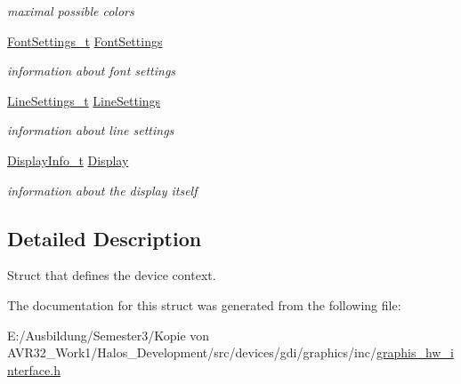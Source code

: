 \begin{CompactItemize}
\begin{CompactList}\small\item\em maximal possible colors \item\end{CompactList}\item 
\hypertarget{struct_device_context__t_3c447b3af8870b05c8dc0ba416cb0d02}{
\hyperlink{struct_font_settings__t}{FontSettings\_\-t} \hyperlink{struct_device_context__t_3c447b3af8870b05c8dc0ba416cb0d02}{FontSettings}}
\label{struct_device_context__t_3c447b3af8870b05c8dc0ba416cb0d02}

\begin{CompactList}\small\item\em information about font settings \item\end{CompactList}\item 
\hypertarget{struct_device_context__t_1b31e011cbea7dbd83f12b8f64593b5e}{
\hyperlink{struct_line_settings__t}{LineSettings\_\-t} \hyperlink{struct_device_context__t_1b31e011cbea7dbd83f12b8f64593b5e}{LineSettings}}
\label{struct_device_context__t_1b31e011cbea7dbd83f12b8f64593b5e}

\begin{CompactList}\small\item\em information about line settings \item\end{CompactList}\item 
\hypertarget{struct_device_context__t_5611d02e13f7ba77cd3048c62a5c5ae8}{
\hyperlink{struct_display_info__t}{DisplayInfo\_\-t} \hyperlink{struct_device_context__t_5611d02e13f7ba77cd3048c62a5c5ae8}{Display}}
\label{struct_device_context__t_5611d02e13f7ba77cd3048c62a5c5ae8}

\begin{CompactList}\small\item\em information about the display itself \item\end{CompactList}\end{CompactItemize}


\subsection{Detailed Description}
Struct that defines the device context. 

The documentation for this struct was generated from the following file:\begin{CompactItemize}
\item 
E:/Ausbildung/Semester3/Kopie von AVR32\_\-Work1/Halos\_\-Development/src/devices/gdi/graphics/inc/\hyperlink{graphis__hw__interface_8h}{graphis\_\-hw\_\-interface.h}\end{CompactItemize}
